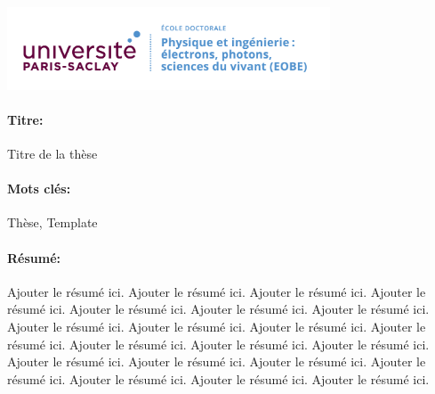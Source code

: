 \documentclass[12pt,a4paper]{book}
\begin{document}
\lhead{}
\rhead{}
\rfoot{}
\cfoot{}
\lfoot{}

\noindent 
\includegraphics[height=2.45cm]{EOBE}
\vspace{1cm}

\begin{mdframed}[linecolor=Prune,linewidth=1]
\vspace{-.25cm}
\paragraph*{Titre:} Titre de la thèse

\begin{small}
\vspace{-.25cm}
\paragraph*{Mots clés:} Thèse, Template

\vspace{-.5cm}
\begin{multicols}{2}
\paragraph*{Résumé:} Ajouter le résumé ici. Ajouter le résumé ici. Ajouter le résumé ici. Ajouter le résumé ici. Ajouter le résumé ici. Ajouter le résumé ici. Ajouter le résumé ici. Ajouter le résumé ici. Ajouter le résumé ici. Ajouter le résumé ici. Ajouter le résumé ici. Ajouter le résumé ici. Ajouter le résumé ici. Ajouter le résumé ici. Ajouter le résumé ici. Ajouter le résumé ici. Ajouter le résumé ici. Ajouter le résumé ici. Ajouter le résumé ici. Ajouter le résumé ici. Ajouter le résumé ici.
\end{multicols}
\end{small}
\end{mdframed}
\end{document}
